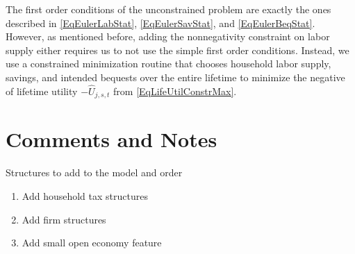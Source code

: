 \documentclass[letterpaper,12pt]{article}
\theoremstyle{definition}
\begin{document}
  The first order conditions of the unconstrained problem are exactly the ones described in \eqref{EqEulerLabStat}, \eqref{EqEulerSavStat}, and \eqref{EqEulerBeqStat}. However, as mentioned before, adding the nonnegativity constraint on labor supply either requires us to not use the simple first order conditions. Instead, we use a constrained minimization routine that chooses household labor supply, savings, and intended bequests over the entire lifetime to minimize the negative of lifetime utility $-\hat{U}_{j,s,t}$ from \eqref{EqLifeUtilConstrMax}.





\newpage
\section{Comments and Notes}\label{TAppComments}

  \noindent Structures to add to the model and order
  \begin{enumerate}
    \item Add household tax structures
    \item Add firm structures
    \item Add small open economy feature
  \end{enumerate}
\end{document}
